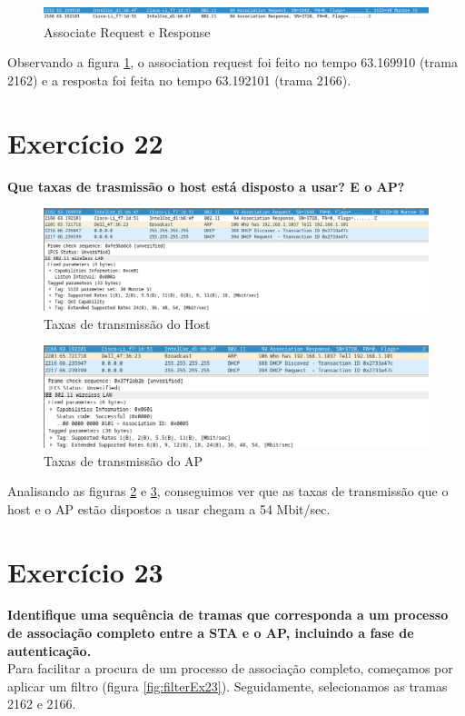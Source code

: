 \documentclass[a4paper]{report}
\begin{document}
\begin{figure}[H]
    \centering 
    \includegraphics[width=\textwidth]{images/associationEx21.png}  
    \caption{Associate Request e Response}
    \label{fig:associationEx21}
\end{figure}
Observando a figura \ref{fig:associationEx21}, o association request foi feito 
no tempo 63.169910 (trama 2162) e a resposta foi feita no tempo 63.192101 
(trama 2166).

\section{Exercício 22}
\textbf{Que taxas de trasmissão o host está disposto a usar? E o AP?}\\

\begin{figure}[H]
    \centering 
    \includegraphics[width=\textwidth]{images/hostEx22.png}  
    \caption{Taxas de transmissão do Host}
    \label{fig:hostEx22}
\end{figure}

\begin{figure}[H]
    \centering 
    \includegraphics[width=\textwidth]{images/apEx22.png}  
    \caption{Taxas de transmissão do AP}
    \label{fig:apEx22}
\end{figure}
Analisando as figuras \ref{fig:hostEx22} e \ref{fig:apEx22}, conseguimos ver que
as taxas de transmissão que o host e o AP estão dispostos a usar chegam a 54 Mbit/sec.

\section{Exercício 23}
\textbf{Identifique uma sequência de tramas que corresponda a um processo de
associação completo entre a STA e o AP, incluindo a fase de autenticação.}\\
Para facilitar a procura de um processo de associação completo, começamos por aplicar
um filtro (figura \ref{fig:filterEx23}). Seguidamente, selecionamos as tramas 2162 e 2166.
\end{document}
